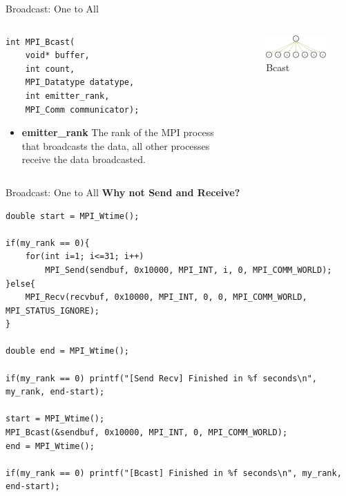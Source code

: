 \begin{frame}[fragile]{Broadcast: One to All}
    \begin{columns}
    
\begin{column}{.4\textwidth}
\begin{verbatim}
int MPI_Bcast(
    void* buffer,
    int count,
    MPI_Datatype datatype,
    int emitter_rank,
    MPI_Comm communicator);
\end{verbatim}

{\footnotesize
\begin{itemize}
    \item \textbf{emitter\_rank} 
The rank of the MPI process that broadcasts the data, all other processes receive the data broadcasted.
\end{itemize}
}
\end{column}

\begin{column}{.6\textwidth}
\begin{figure}
    \centering
    \includegraphics[width=0.75\linewidth]{day8_am/img/mpi/bcast.png}
    \caption{Bcast}
    \label{fig:bcast}
\end{figure}
\end{column}
\end{columns}
\end{frame}

\begin{frame}[fragile]{Broadcast: One to All}
\textbf{\large Why not Send and Receive?}

\begin{verbatim}
double start = MPI_Wtime();

if(my_rank == 0){
    for(int i=1; i<=31; i++)
        MPI_Send(sendbuf, 0x10000, MPI_INT, i, 0, MPI_COMM_WORLD);
}else{
    MPI_Recv(recvbuf, 0x10000, MPI_INT, 0, 0, MPI_COMM_WORLD, MPI_STATUS_IGNORE);
}

double end = MPI_Wtime();

if(my_rank == 0) printf("[Send Recv] Finished in %f seconds\n", my_rank, end-start);

start = MPI_Wtime();
MPI_Bcast(&sendbuf, 0x10000, MPI_INT, 0, MPI_COMM_WORLD);
end = MPI_Wtime();

if(my_rank == 0) printf("[Bcast] Finished in %f seconds\n", my_rank, end-start);
\end{verbatim}

\end{frame}

